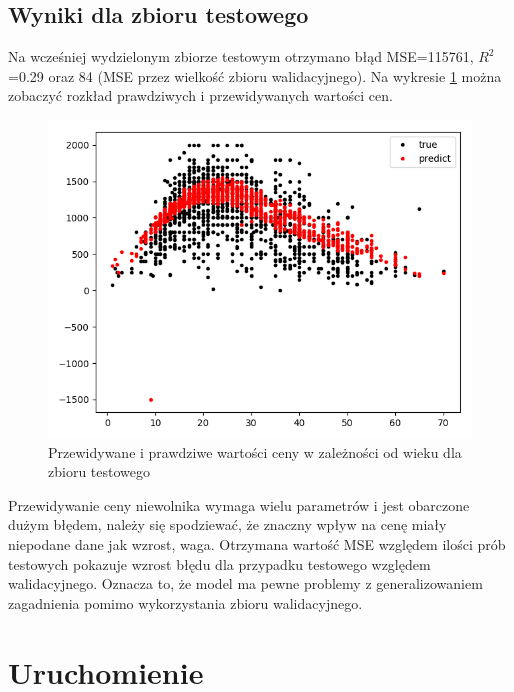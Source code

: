\documentclass[a4paper,12pt]{article}
\begin{document}
	\subsection{Wyniki dla zbioru testowego}
		Na wcześniej wydzielonym zbiorze testowym otrzymano błąd MSE=115761, $R^2$=0.29 oraz 84 (MSE przez wielkość zbioru walidacyjnego). Na wykresie \ref{test_predict} można zobaczyć rozkład prawdziwych i przewidywanych wartości cen.
		\begin{figure}[h]
			\centering
			\includegraphics[scale=0.6]{obrazy/test_predict.png} 
			\caption{Przewidywane i prawdziwe wartości ceny w zależności od wieku dla zbioru testowego}
			\label{test_predict}
		\end{figure}	
		Przewidywanie ceny niewolnika wymaga wielu parametrów i jest obarczone dużym błędem, należy się spodziewać, że znaczny wpływ na cenę miały niepodane dane jak wzrost, waga. Otrzymana wartość MSE względem ilości prób testowych pokazuje wzrost błędu dla przypadku testowego względem walidacyjnego. Oznacza to, że model ma pewne problemy z generalizowaniem zagadnienia pomimo wykorzystania zbioru walidacyjnego.
		
\section{Uruchomienie}
\end{document}
